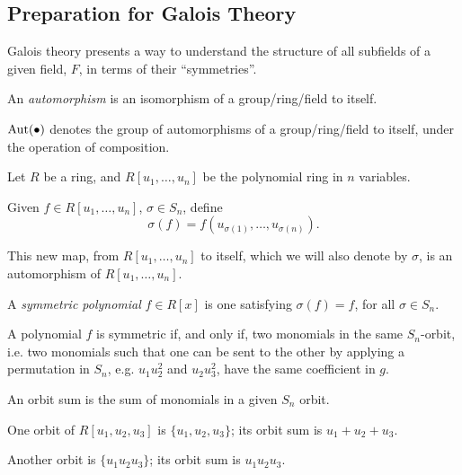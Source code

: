 \subsection{Preparation for Galois Theory}

Galois theory presents a way to understand the structure of all subfields of a given field, $F$, in terms of their ``symmetries''.

\begin{defn}
	An \emph{automorphism} is an isomorphism of a group/ring/field to itself.

	$\operatorname{Aut}(\bullet)$ denotes the group of automorphisms of a group/ring/field to itself, under the operation of composition.
\end{defn}

Let $R$ be a ring, and $R[u_1, \dots, u_n]$ be the polynomial ring in $n$ variables.

Given $f \in R[u_1, \dots, u_n]$, $\sigma \in S_n$, define \[
	\sigma(f) = f(u_{\sigma(1)}, \dots, u_{\sigma(n)}).
\]

This new map, from $R[u_1, \dots, u_n]$ to itself, which we will also denote by $\sigma$, is an automorphism of  $R[u_1, \dots, u_n]$.

\begin{defn}
	A \emph{symmetric polynomial} $f \in R[x]$ is one satisfying $\sigma(f) = f$, for all $\sigma \in S_n$.
\end{defn}

\begin{prop}
	A polynomial $f$ is symmetric if, and only if, two monomials in the same $S_n$-orbit, i.e. two monomials such that one can be sent to the other by applying a permutation in $S_n$, e.g. $u_1u_2^2$ and  $u_2u_3^2$, have the same coefficient in $g$. 
\end{prop}

\begin{defn}	
	An orbit sum is the sum of monomials in a given $S_n$ orbit.
\end{defn}

\begin{exmp}
	One orbit of $R[u_1, u_2, u_3]$ is  $\{ u_1, u_2, u_3\}$; its orbit sum is $u_1 + u_2 + u_3$. 

	Another orbit is $\{u_1u_2u_3\}$; its orbit sum is $u_1u_2u_3$.
\end{exmp}

